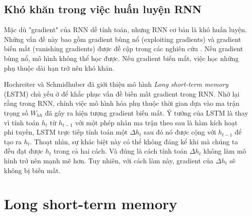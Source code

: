 

\subsection{Khó khăn trong việc huấn luyện RNN}

Mặc dù "gradient" của RNN dễ tính toán, nhưng RNN cơ bản là khó huấn luyện. Những vấn đề này bao gồm gradient bùng nổ (exploiting gradients) và gradient biến mất (vanishing gradients) được đề cập trong các nghiên cứu \cite{pascanu2011} \cite{hochreiter1997}. Nếu gradient bùng nổ, mô hình không thể học được. Nếu gradient biến mất, việc học những phụ thuộc dài hạn trở nên khó khăn.

Hochreiter và Schmidhuber \cite{hochreiter1997} đã giới thiệu mô hình \textit{Long short-term memory} (LSTM) chủ yếu ở để khắc phục vấn đề biến mất gradient trong RNN. Nhớ lại rằng trong RNN, chính việc mô hình hóa phụ thuộc thời gian dựa vào ma trận trọng số $W_{hh}$ đã gây ra hiện tượng gradient biến mất. Ý tưởng của LSTM là thay vì tính toán $h_t$ từ $h_{t-1}$ với một phép nhân ma trận theo sau là hàm kích hoạt phi tuyến, LSTM trực tiếp tính toán một $\Delta h_t$ sau đó nó được cộng với $h_{t-1}$ để tạo ra $h_t$. Thoạt nhìn, sự khác biệt này có thể không đáng kể khi mà chúng ta đều đạt được $h_t$ trong cả hai cách. Và đúng là cách tính toán $\Delta h_t$ không làm mô hình trở nên mạnh mẽ hơn. Tuy nhiên, với cách làm này, gradient của $\Delta h_t$ sẽ không bị biến mất.

\section{Long short-term memory}

